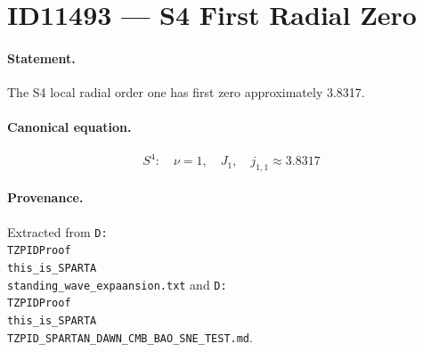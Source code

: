 \section*{ID11493 --- S4 First Radial Zero}

\paragraph{Statement.}
The S4 local radial order one has first zero approximately 3.8317.

\paragraph{Canonical equation.}
\[
S^4:\quad\nu=1,\quad J_1,\quad j_{1,1}\approx3.8317
\]

\paragraph{Provenance.}
Extracted from \texttt{D:\\TZPIDProof\\this\_is\_SPARTA\\standing\_wave\_expaansion.txt} and \texttt{D:\\TZPIDProof\\this\_is\_SPARTA\\TZPID\_SPARTAN\_DAWN\_CMB\_BAO\_SNE\_TEST.md}.
